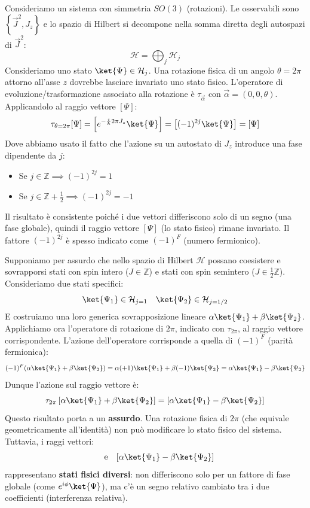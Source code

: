 Consideriamo un sistema con simmetria $SO(3)$ (rotazioni).
Le osservabili sono $\left\{ \vec{J}^2, J_z \right\}$ e lo spazio di Hilbert si decompone nella somma diretta degli autospazi di $\vec{J}^2$:
\[
    \mathcal{H} = \bigoplus_j \mathcal{H}_j
\]
Consideriamo uno stato $\ket{\Psi} \in \mathcal{H}_j$. Una rotazione fisica di un angolo $\theta = 2\pi$ attorno all'asse $z$ dovrebbe lasciare invariato uno stato fisico.
L'operatore di evoluzione/trasformazione associato alla rotazione è $\tau_{\vec{\alpha}}$ con $\vec{\alpha}=(0,0,\theta)$.
Applicandolo al raggio vettore $[\Psi]$:
\[
    \tau_{\theta=2\pi}[\Psi] = \left[ e^{-\frac{i}{\hbar} 2\pi J_z} \ket{\Psi} \right] = \left[ (-1)^{2j} \ket{\Psi} \right] = [\Psi]
\]
Dove abbiamo usato il fatto che l'azione su un autostato di $J_z$ introduce una fase dipendente da $j$:
\begin{itemize}
    \item Se $j \in \mathbb{Z} \implies (-1)^{2j} = 1$
    \item Se $j \in \mathbb{Z} + \frac{1}{2} \implies (-1)^{2j} = -1$
\end{itemize}
Il risultato è consistente poiché i due vettori differiscono solo di un segno (una fase globale), quindi il raggio vettore $[\Psi]$ (lo stato fisico) rimane invariato.
Il fattore $(-1)^{2j}$ è spesso indicato come $(-1)^F$ (numero fermionico).

Supponiamo per assurdo che nello spazio di Hilbert $\mathcal{H}$ possano coesistere e sovrapporsi stati con spin intero ($J \in \mathbb{Z}$) e stati con spin semintero ($J \in \frac{1}{2}\mathbb{Z}$).
Consideriamo due stati specifici:
\[
    \ket{\Psi_1} \in \mathcal{H}_{j=1}  \quad \ket{\Psi_2} \in \mathcal{H}_{j=1/2}
\]
E costruiamo una loro generica sovrapposizione lineare $\alpha \ket{\Psi_1} + \beta \ket{\Psi_2}$.
Applichiamo ora l'operatore di rotazione di $2\pi$, indicato con $\tau_{2\pi}$, al raggio vettore corrispondente. L'azione dell'operatore corrisponde a quella di $(-1)^F$ (parità fermionica):
\[
    (-1)^F (\alpha \ket{\Psi_1} + \beta \ket{\Psi_2}) = \alpha (+1)\ket{\Psi_1} + \beta (-1)\ket{\Psi_2} = \alpha \ket{\Psi_1} - \beta \ket{\Psi_2}
\]
Dunque l'azione sul raggio vettore è:
\[
    \tau_{2\pi} \left[ \alpha \ket{\Psi_1} + \beta \ket{\Psi_2} \right] = \left[ \alpha \ket{\Psi_1} - \beta \ket{\Psi_2} \right]
\]
Questo risultato porta a un \textbf{assurdo}. Una rotazione fisica di $2\pi$ (che equivale geometricamente all'identità) non può modificare lo stato fisico del sistema. Tuttavia, i raggi vettori:
\begin{equation}
    [\alpha \ket{\Psi_1} + \beta \ket{\Psi_2}] \quad \text{e} \quad [\alpha \ket{\Psi_1} - \beta \ket{\Psi_2}]
\end{equation}
rappresentano \textbf{stati fisici diversi}: non differiscono solo per un fattore di fase globale (come $e^{i\phi}\ket{\Psi}$), ma c'è un segno relativo cambiato tra i due coefficienti (interferenza relativa).

